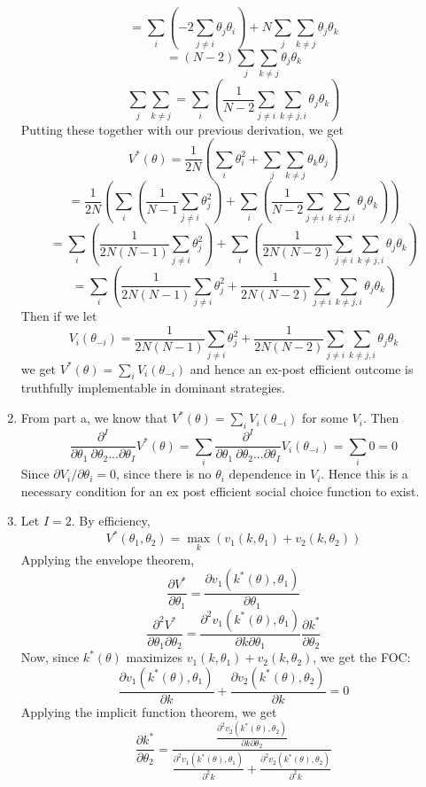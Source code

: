 \documentclass[10pt,letter]{article}
\begin{document}
\begin{enumerate}[label=(\alph*)]
  \[ = \sum_i \left( - 2\sum_{j \neq i} \theta_j \theta_i\right) + N \sum_{j} \sum_{k \neq j} \theta_j \theta_k  \]
  \[ = (N-2) \sum_{j} \sum_{k \neq j} \theta_j \theta_k  \]
  \[ \sum_j \sum_{k \neq j} = \sum_i  \left( \frac{1}{N-2}\sum_{j \neq i} \sum_{k \neq j, i} \theta_j \theta_k \right) \]
  Putting these together with our previous derivation, we get
  \[ V^*(\theta) = \frac{1}{2N}\left(\sum_{i} \theta_i^2 + \sum_j \sum_{k \neq j} \theta_k \theta_j \right)  \]
  \[ = \frac{1}{2N}\left(\sum_i \left(\frac{1}{N-1}\sum_{j \neq i} \theta_j^2 \right) + \sum_i  \left( \frac{1}{N-2}\sum_{j \neq i} \sum_{k \neq j, i} \theta_j \theta_k \right) \right)  \]
  \[ = \sum_i \left(\frac{1}{2N(N-1)}\sum_{j \neq i} \theta_j^2 \right) + \sum_i  \left( \frac{1}{2N(N-2)}\sum_{j \neq i} \sum_{k \neq j, i} \theta_j \theta_k \right)  \]
  \[ = \sum_i \left(\frac{1}{2N(N-1)}\sum_{j \neq i} \theta_j^2 + \frac{1}{2N(N-2)}\sum_{j \neq i} \sum_{k \neq j, i} \theta_j \theta_k \right)  \]
  Then if we let
  \[ V_i(\theta_{-i}) = \frac{1}{2N(N-1)}\sum_{j \neq i} \theta_j^2 + \frac{1}{2N(N-2)}\sum_{j \neq i} \sum_{k \neq j, i} \theta_j \theta_k \]
  we get $V^*(\theta) = \sum_i V_i(\theta_{-i})$ and hence an ex-post efficient outcome is truthfully implementable in dominant strategies.
  \item From part a, we know that $V^*(\theta) = \sum_i V_i(\theta_{-i})$ for some $V_i$. Then
  \[ \frac{\partial^I}{\partial \theta_1 \ \partial \theta_2 ... \partial \theta_I} V^*(\theta) =  \sum_i \frac{\partial^I}{\partial \theta_1 \ \partial \theta_2 ... \partial \theta_I} V_i(\theta_{-i}) = \sum_i 0 = 0 \]
  Since $\partial V_i / \partial \theta_i = 0$, since there is no $\theta_i$ dependence in $V_i$. Hence this is a necessary condition for an ex post efficient social choice function to exist.
  \item Let $I=2$. By efficiency,
  \[ V^*(\theta_1, \theta_2) = \max_k (v_1(k, \theta_1) + v_2(k, \theta_2)) \]
  Applying the envelope theorem,
  \[ \frac{\partial V^*}{\partial \theta_1} = \frac{\partial v_1(k^*(\theta), \theta_1)}{\partial \theta_1} \]
  \[ \frac{\partial^2 V^*}{\partial \theta_1 \partial \theta_2} = \frac{\partial^2 v_1(k^*(\theta), \theta_1)}{\partial k \partial \theta_1}\frac{\partial k^*}{\partial \theta_2} \]
  Now, since $k^*(\theta)$ maximizes $v_1(k, \theta_1) + v_2(k, \theta_2)$, we get the FOC:
  \[ \frac{\partial v_1(k^*(\theta), \theta_1)}{\partial k} + \frac{\partial v_2(k^*(\theta), \theta_2)}{\partial k}  = 0 \]
  Applying the implicit function theorem, we get
  \[ \frac{\partial k^*}{\partial \theta_2} = \frac{\frac{\partial^2 v_2(k^*(\theta), \theta_2)}{\partial k \partial \theta_2}}{\frac{\partial^2 v_1(k^*(\theta), \theta_1)}{\partial^2 k} + \frac{\partial^2 v_2(k^*(\theta), \theta_2)}{\partial^2 k}} \]

\end{enumerate}
\end{document}
